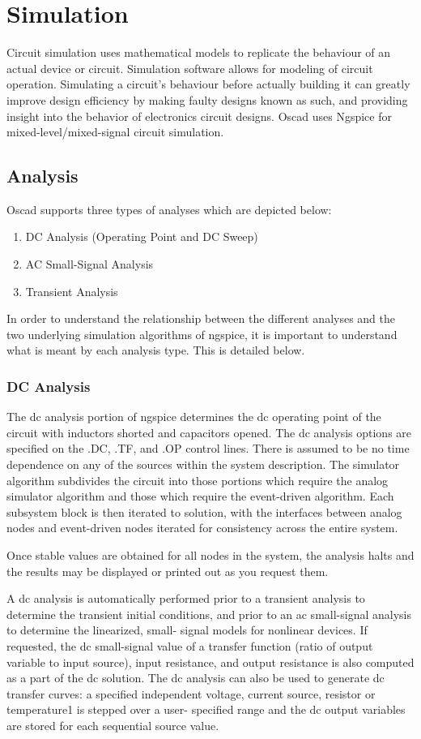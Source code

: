 \chapter{Simulation}
\label{sim}
Circuit simulation uses mathematical models to replicate the behaviour of an actual device or circuit. Simulation software allows for modeling of circuit operation. Simulating a circuit's behaviour before actually building it can greatly improve design efficiency by making faulty designs known as such, and providing insight into the behavior of electronics circuit designs. Oscad uses Ngspice for mixed-level/mixed-signal circuit simulation. 
\section{Analysis}
Oscad supports three types of analyses which are depicted below:
\begin{enumerate}
\item DC Analysis (Operating Point and DC Sweep) 
\item AC Small-Signal Analysis 
\item Transient Analysis 
\end{enumerate}
In order to understand the relationship between the different analyses and the two underlying simulation algorithms of ngspice, it is important to understand what is meant by each analysis type. This is detailed below. 
\subsection{DC Analysis}
The dc analysis portion of ngspice determines the dc operating point of the circuit with inductors shorted and capacitors opened. The dc analysis options are specified on the .DC, .TF, and .OP control lines. 
There is assumed to be no time dependence on any of the sources within the system description. The simulator algorithm subdivides the circuit into those portions which require the analog simulator algorithm and those which require the event-driven algorithm. Each subsystem block is then iterated to solution, with the interfaces between analog nodes and event-driven nodes iterated for consistency across the entire system. 

Once stable values are obtained for all nodes in the system, the analysis halts and the results may be displayed or printed out as you request them.
 
A dc analysis is automatically performed prior to a transient analysis to determine the transient initial conditions, and prior to an ac small-signal analysis to determine the linearized, small- signal models for nonlinear devices. If requested, the dc small-signal value of a transfer function (ratio of output variable to input source), input resistance, and output resistance is also computed as a part of the dc solution. The dc analysis can also be used to generate dc transfer curves: a specified independent voltage, current source, resistor or temperature1 is stepped over a user- specified range and the dc output variables are stored for each sequential source value. 
